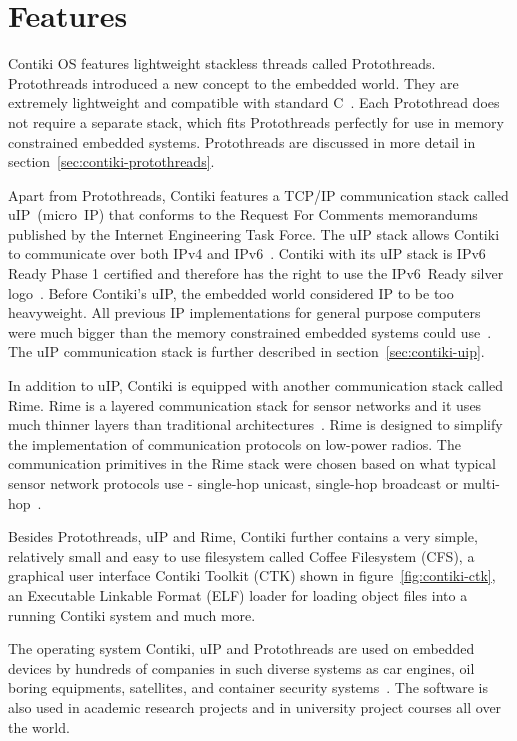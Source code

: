 
\section{Features}
Contiki OS features lightweight stackless threads called Protothreads.
Protothreads introduced a new concept to the embedded world.
They are extremely lightweight and compatible with standard C~\cite{paper-protothreads}.
Each Protothread does not require a separate stack, which fits Protothreads perfectly
for use in memory constrained embedded systems.
Protothreads are discussed in more detail in section~\ref{sec:contiki-protothreads}.

Apart from Protothreads, Contiki features a TCP/IP communication stack called uIP~(micro~IP)
that conforms to the Request For Comments memorandums published by the Internet Engineering Task Force.
The uIP stack allows Contiki to communicate over both IPv4 and IPv6~\cite{contiki-docs}.
Contiki with its uIP stack is IPv6 Ready Phase 1 certified
and therefore has the right to use the IPv6~Ready silver logo~\cite{ipv6ready-db}.
Before Contiki's uIP, the embedded world considered IP to be too heavyweight.
All previous IP implementations for general purpose computers
were much bigger than the memory constrained embedded systems could use~\cite{interconnecting}.
The uIP communication stack is further described in section~\ref{sec:contiki-uip}.

In addition to uIP, Contiki is equipped with another communication stack called Rime.
Rime is a layered communication stack for sensor networks and it uses
much thinner layers than traditional architectures~\cite{paper-rime}.
Rime is designed to simplify the implementation of communication
protocols on low-power radios.
The communication primitives in the Rime stack were chosen
based on what typical sensor network protocols use -
single-hop unicast, single-hop broadcast or multi-hop~\cite{contiki-docs,paper-rime}.

Besides Protothreads, uIP and Rime,
Contiki further contains a very simple, relatively small and easy to use filesystem
called Coffee Filesystem (CFS),
a graphical user interface Contiki Toolkit (CTK) shown in figure~\ref{fig:contiki-ctk}, an
Executable Linkable Format (ELF) loader for loading object files into a running Contiki system
and much more.

The operating system Contiki, uIP and Protothreads are used on embedded devices by hundreds of companies in
such diverse systems as car engines, oil boring equipments, satellites, and container security systems~\cite{thesis-programming}.
The software is also used in academic research
projects and in university project courses all over the world.

